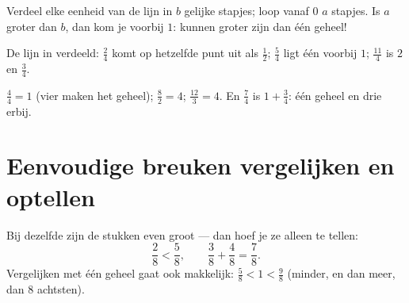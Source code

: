 \begin{method}\label{met:g4:fractions:line}
Verdeel elke eenheid van de lijn in $b$ gelijke stapjes; loop vanaf $0$
$a$ stapjes. Is $a$ groter dan $b$, dan kom je voorbij $1$:  kunnen
groter zijn dan één geheel!
\end{method}

\begin{omfigure}

{\small De lijn in  verdeeld: $\frac24$ komt op hetzelfde punt uit
als $\frac12$; $\frac54$ ligt één  voorbij $1$; $\frac{11}{4}$ is
$2$ en $\frac34$.}
\end{omfigure}

\begin{example}\label{ex:g4:fractions:whole}
$\frac44 = 1$ (vier  maken het geheel); $\frac82 = 4$;
$\frac{12}{3} = 4$. En $\frac74$ is $1 + \frac34$: één geheel en drie
 erbij.
\end{example}

\section{Eenvoudige breuken vergelijken en optellen}

\begin{proposition}\label{prop:g4:fractions:compare}
Bij dezelfde  zijn de stukken even groot --- dan hoef je ze alleen
te tellen:
\[
\frac{2}{8} < \frac{5}{8},
\qquad
\frac{3}{8} + \frac{4}{8} = \frac{7}{8}.
\]
Vergelijken met één geheel gaat ook makkelijk:
$\frac{5}{8} < 1 < \frac{9}{8}$ (minder, en dan meer, dan $8$ achtsten).
\end{proposition}

